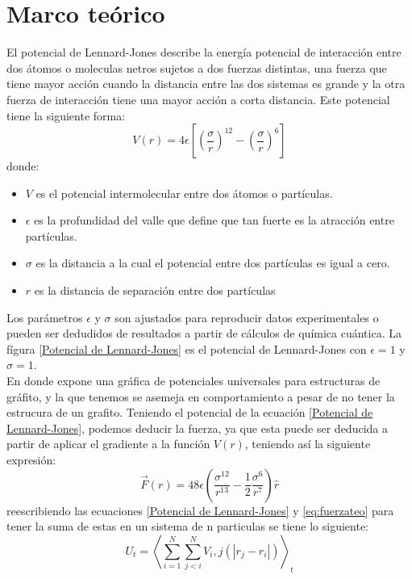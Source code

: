 \documentclass[reprint,amsmath,amssymb,aps,]{revtex4-2}
\begin{document}
\section{Marco teórico}
El potencial de Lennard-Jones describe la energía potencial de interacción entre dos átomos o moleculas netros sujetos a dos fuerzas distintas, una fuerza que tiene mayor acción cuando la distancia entre las dos sistemas es grande y la otra fuerza de interacción tiene una mayor acción a corta distancia. Este potencial tiene la siguiente forma:
\begin{equation}
    \label{Potencial de Lennard-Jones}
    V(r) = 4 \epsilon \left[\left(\frac{\sigma}{r} \right)^{12} - \left(\frac{\sigma}{r} \right)^6 \right]
\end{equation}
donde:
\begin{itemize}
    \item $V$ es el potencial intermolecular entre dos átomos o partículas.
    \item $\epsilon$ es la profundidad del valle que define que tan fuerte es la atracción entre partículas.
    \item $\sigma$ es la distancia a la cual el potencial entre dos partículas es igual a cero.
    \item $r$ es la distancia de separación entre dos partículas
\end{itemize}
Los parámetros $\epsilon$ y $\sigma$ son ajustados para reproducir datos experimentales o pueden ser dedudidos de resultados a partir de cálculos de química cuántica. La fígura \ref{Potencial de Lennard-Jones} es el potencial de Lennard-Jones con $\epsilon=1$ y $\sigma=1$.\\
En donde expone una gráfica de potenciales universales para estructuras de gráfito, y la que tenemos se asemeja en comportamiento a pesar de no tener la estrucura de un grafito.
Teniendo el potencial de la ecuación \ref{Potencial de Lennard-Jones}, podemos deducir la fuerza, ya que esta puede ser deducida a partir de aplicar el gradiente a la función $V(r)$, teniendo así la siguiente expresión:
\begin{equation}
    \label{eq:fuerzateo}
    \vec{F}(r)= 48\epsilon \left(\frac{\sigma^{12}}{r^{13}}- \frac{1}{2}\frac{\sigma^6}{r^7} \right) \hat{r}
\end{equation}
reescribiendo las ecuaciones \ref{Potencial de Lennard-Jones} y \ref{eq:fuerzateo} para tener la suma de estas en un sistema de n particulas se tiene lo siguiente:
\begin{equation}
    \label{eq:pot-n}
    U_t=\left\langle\sum_{i=1}^N \sum_{j<i}^N V_i,j(|r_j-r_i|)\right\rangle_t
\end{equation}
\end{document}
